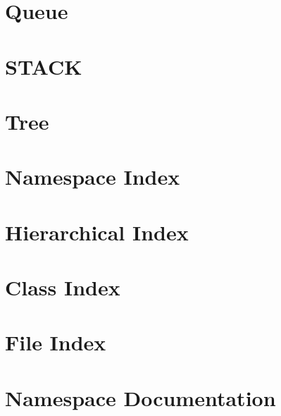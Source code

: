 \documentclass[twoside]{book}
\newcommand{\+}{\discretionary{\mbox{\scriptsize$\hookleftarrow$}}{}{}}
\begin{document}
\chapter{Queue}
\label{md_src_main_java_com_thealgorithms_datastructures_queues__r_e_a_d_m_e}

\chapter{STACK}
\label{md_src_main_java_com_thealgorithms_datastructures_stacks__r_e_a_d_m_e}

\chapter{Tree}
\label{md_src_main_java_com_thealgorithms_datastructures_trees__r_e_a_d_m_e}

\chapter{Namespace Index}

\chapter{Hierarchical Index}

\chapter{Class Index}

\chapter{File Index}

\chapter{Namespace Documentation}




\end{document}
